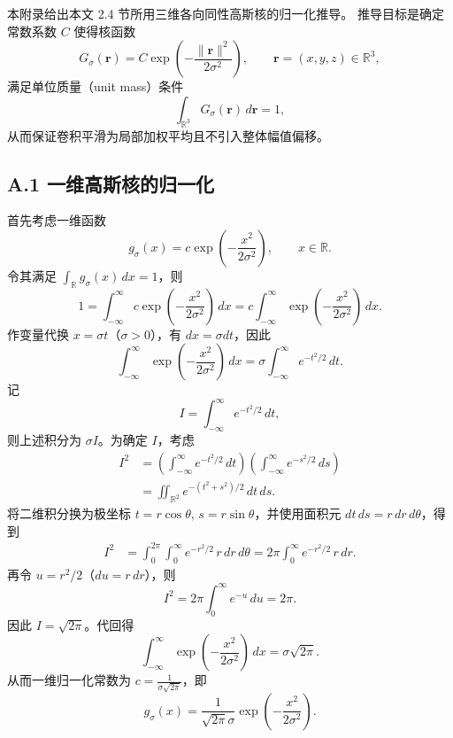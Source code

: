 本附录给出本文 2.4 节所用三维各向同性高斯核的归一化推导。
推导目标是确定常数系数 $C$ 使得核函数
\begin{equation}
G_\sigma(\mathbf{r}) = C \exp\!\left(-\frac{\|\mathbf{r}\|^2}{2\sigma^2}\right),
\qquad \mathbf{r}=(x,y,z)\in\mathbb{R}^3,
\end{equation}
满足单位质量（unit mass）条件
\begin{equation}
\int_{\mathbb{R}^3} G_\sigma(\mathbf{r})\,d\mathbf{r}=1,
\end{equation}
从而保证卷积平滑为局部加权平均且不引入整体幅值偏移。

\subsection*{A.1 一维高斯核的归一化}
首先考虑一维函数
\begin{equation}
g_\sigma(x)=c \exp\!\left(-\frac{x^2}{2\sigma^2}\right),
\qquad x\in\mathbb{R}.
\end{equation}
令其满足 $\int_{\mathbb{R}} g_\sigma(x)\,dx=1$，则
\begin{equation}
1=\int_{-\infty}^{\infty} c \exp\!\left(-\frac{x^2}{2\sigma^2}\right)\,dx
=c\int_{-\infty}^{\infty}\exp\!\left(-\frac{x^2}{2\sigma^2}\right)\,dx.
\end{equation}
作变量代换 $x=\sigma t$（$\sigma>0$），有 $dx=\sigma dt$，因此
\begin{equation}
\int_{-\infty}^{\infty}\exp\!\left(-\frac{x^2}{2\sigma^2}\right)\,dx
=\sigma\int_{-\infty}^{\infty} e^{-t^2/2}\,dt.
\end{equation}
记
\begin{equation}
I=\int_{-\infty}^{\infty} e^{-t^2/2}\,dt,
\end{equation}
则上述积分为 $\sigma I$。为确定 $I$，考虑
\begin{equation}
\begin{aligned}
I^2&=\left(\int_{-\infty}^{\infty}e^{-t^2/2}\,dt\right)
     \left(\int_{-\infty}^{\infty}e^{-s^2/2}\,ds\right)\\
&=\iint_{\mathbb{R}^2}e^{-(t^2+s^2)/2}\,dt\,ds.
\end{aligned}
\end{equation}
将二维积分换为极坐标 $t=r\cos\theta,\, s=r\sin\theta$，并使用面积元
$dt\,ds=r\,dr\,d\theta$，得到
\begin{align}
I^2
&=\int_{0}^{2\pi}\int_{0}^{\infty}e^{-r^2/2}\,r\,dr\,d\theta
=2\pi\int_{0}^{\infty}e^{-r^2/2}\,r\,dr.
\end{align}
再令 $u=r^2/2$（$du=r\,dr$），则
\begin{equation}
I^2=2\pi\int_{0}^{\infty}e^{-u}\,du
=2\pi.
\end{equation}
因此 $I=\sqrt{2\pi}$。代回得
\begin{equation}
\int_{-\infty}^{\infty}\exp\!\left(-\frac{x^2}{2\sigma^2}\right)\,dx
=\sigma\sqrt{2\pi}.
\end{equation}
从而一维归一化常数为 $c=\frac{1}{\sigma\sqrt{2\pi}}$，即
\begin{equation}
g_\sigma(x)=\frac{1}{\sqrt{2\pi}\sigma}
\exp\!\left(-\frac{x^2}{2\sigma^2}\right).
\end{equation}

